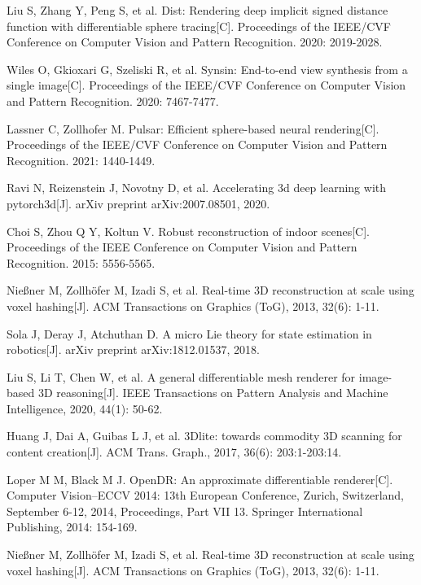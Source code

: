 Liu S, Zhang Y, Peng S, et al. Dist: Rendering deep implicit signed distance function with differentiable sphere tracing[C]. Proceedings of the IEEE/CVF Conference on Computer Vision and Pattern Recognition. 2020: 2019-2028.

Wiles O, Gkioxari G, Szeliski R, et al. Synsin: End-to-end view synthesis from a single image[C]. Proceedings of the IEEE/CVF Conference on Computer Vision and Pattern Recognition. 2020: 7467-7477.

Lassner C, Zollhofer M. Pulsar: Efficient sphere-based neural rendering[C]. Proceedings of the IEEE/CVF Conference on Computer Vision and Pattern Recognition. 2021: 1440-1449.

Ravi N, Reizenstein J, Novotny D, et al. Accelerating 3d deep learning with pytorch3d[J]. arXiv preprint arXiv:2007.08501, 2020.

Choi S, Zhou Q Y, Koltun V. Robust reconstruction of indoor scenes[C]. Proceedings of the IEEE Conference on Computer Vision and Pattern Recognition. 2015: 5556-5565.

 Nießner M, Zollhöfer M, Izadi S, et al. Real-time 3D reconstruction at scale using voxel hashing[J]. ACM Transactions on Graphics (ToG), 2013, 32(6): 1-11.


Sola J, Deray J, Atchuthan D. A micro Lie theory for state estimation in robotics[J]. arXiv preprint arXiv:1812.01537, 2018.


Liu S, Li T, Chen W, et al. A general differentiable mesh renderer for image-based 3D reasoning[J]. IEEE Transactions on Pattern Analysis and Machine Intelligence, 2020, 44(1): 50-62.

Huang J, Dai A, Guibas L J, et al. 3Dlite: towards commodity 3D scanning for content creation[J]. ACM Trans. Graph., 2017, 36(6): 203:1-203:14.

Loper M M, Black M J. OpenDR: An approximate differentiable renderer[C]. Computer Vision–ECCV 2014: 13th European Conference, Zurich, Switzerland, September 6-12, 2014, Proceedings, Part VII 13. Springer International Publishing, 2014: 154-169.

Nießner M, Zollhöfer M, Izadi S, et al. Real-time 3D reconstruction at scale using voxel hashing[J]. ACM Transactions on Graphics (ToG), 2013, 32(6): 1-11.

